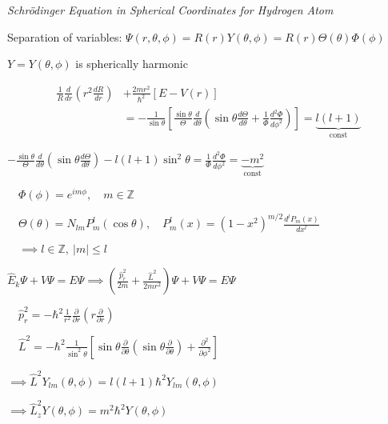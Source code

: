 \documentclass[twocolumn]{article}
\begin{document}
\textit{Schr\"odinger Equation in Spherical Coordinates for Hydrogen Atom}

Separation of variables: $\Psi(r, \theta, \phi) = R(r) Y(\theta, \phi) = R(r) \Theta(\theta) \Phi(\phi)$

$Y = Y(\theta, \phi)$ is spherically harmonic
\vspace{-2em}

\begin{equation*}
    \begin{split}
        \frac{1}{R} \frac{d}{dr} \left( r^2 \frac{dR}{dr} \right) &+ \frac{2mr^2}{\hbar^2} [E - V(r)] \\
        &= -\frac{1}{\sin \theta} \left[ \frac{\sin \theta}{\Theta} \frac{d}{d\theta} \left( \sin \theta \frac{d\Theta}{d\theta} + \frac{1}{\Phi} \frac{d^2\Phi}{d\phi^2} \right) \right] = \underbrace{l(l+1)}_{\text{const}}
    \end{split}
\end{equation*} \vspace{-1.5em}

\vspace{-.5em}
\dotfill

$-\frac{\sin \theta}{\Theta} \frac{d}{d\theta} \left( \sin \theta \frac{d\Theta}{d\theta} \right) - l(l+1) \sin^2 \theta = \frac{1}{\Phi} \frac{d^2 \Phi}{d\phi^2} = \underbrace{-m^2}_{\text{const}}$

$\quad \Phi(\phi) = e^{im\phi}, \quad m \in \mathbb{Z}$

$\quad \Theta(\theta) = N_{lm} P_m^l(\cos \theta), \quad P_m^l(x) = (1-x^2)^{m/2} \frac{d^l P_m(x)}{dx^l}$

$\quad \implies l \in \mathbb{Z},\ |m| \leq l$

\vspace{-.5em}
\dotfill

$\hat{E}_k \Psi + V \Psi = E\Psi \implies \left( \frac{\hat{p}_r^2}{2m} + \frac{\hat{L}^2}{2mr^2} \right) \Psi + V\Psi = E\Psi$

$\quad \hat{p}_r^2 = -\hbar^2 \frac{1}{r^2} \frac{\partial}{\partial r} \left(r\frac{\partial}{\partial r}\right)$

$\quad \hat{L}^2 = -\hbar^2 \frac{1}{\sin^2\theta} \left[ \sin \theta \frac{\partial}{\partial \theta} \left(\sin \theta \frac{\partial}{\partial \theta}\right) + \frac{\partial^2}{\partial \phi^2} \right]$

$\implies \hat{L}^2 Y_{lm}(\theta, \phi) = l(l+1)\hbar^2 Y_{lm}(\theta, \phi)$

$\implies \hat{L}_z^2 Y(\theta, \phi) = m^2 \hbar^2 Y(\theta, \phi)$
\end{document}
